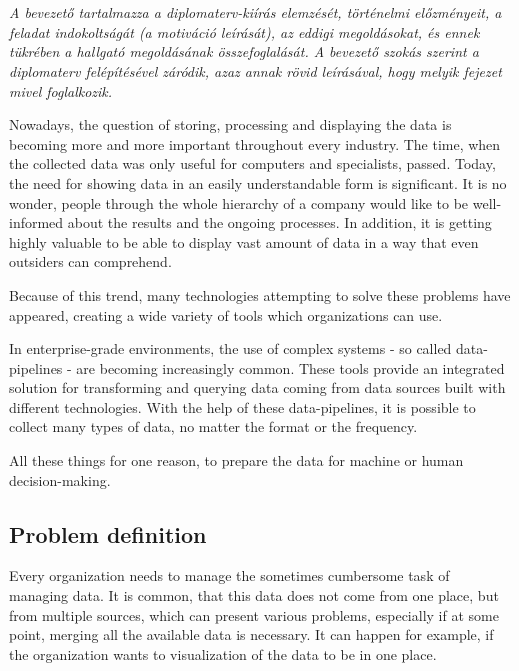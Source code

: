 \chapter{\bevezetes}

\textit{A bevezető tartalmazza a diplomaterv-kiírás elemzését, történelmi előzményeit, a feladat indokoltságát (a motiváció leírását), az eddigi megoldásokat, és ennek tükrében a hallgató megoldásának összefoglalását.
A bevezető szokás szerint a diplomaterv felépítésével záródik, azaz annak rövid leírásával, hogy melyik fejezet mivel foglalkozik.}


Nowadays, the question of storing, processing and displaying the data is becoming more and more important throughout every industry. The time, when the collected data was only useful for computers and specialists, passed. Today, the need for showing data in an easily understandable form is significant. It is no wonder, people through the whole hierarchy of a company would like to be well-informed about the results and the ongoing processes. In addition, it is getting highly valuable to be able to display vast amount of data in a way that even outsiders can comprehend.

Because of this trend, many technologies attempting to solve these problems have
appeared, creating a wide variety of tools which organizations can use.

In enterprise-grade environments, the use of complex systems - so called data-pipelines - are becoming increasingly common. These tools provide an integrated solution for transforming and querying data coming from data sources built with different technologies. With the help of these data-pipelines, it is possible to collect many types of data, no matter the format or the frequency.

All these things for one reason, to prepare the data for machine or human decision-making.

\section{Problem definition}

Every organization needs to manage the sometimes cumbersome task of managing data. It is common, that this data does not come from one place, but from multiple sources, which can present various problems, especially if at some point, merging all the available data is necessary. It can happen for example, if the organization wants to visualization of the data to be in one place.

